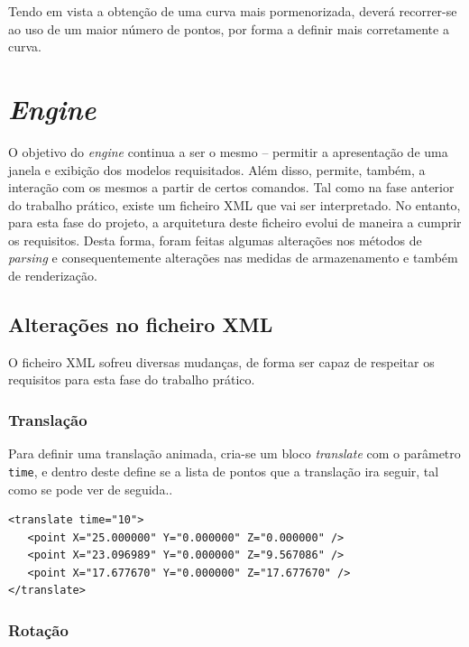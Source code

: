 \documentclass[a4paper, 11pt]{article}
\begin{document}
Tendo em vista a obtenção de uma curva mais pormenorizada, deverá recorrer-se ao uso de um maior 
número de pontos, por forma a definir mais corretamente a curva.

\pagebreak

\section{\textit{Engine}}

O objetivo do \textit{engine} continua a ser o mesmo -- permitir a apresentação de uma janela e 
exibição dos modelos requisitados. Além disso, permite, também, a interação com os mesmos a 
partir de certos comandos. Tal como na fase anterior do trabalho prático, existe um ficheiro XML 
que vai ser interpretado. No entanto, para esta fase do projeto, a arquitetura deste ficheiro 
evolui de maneira a cumprir os requisitos. Desta forma, foram feitas algumas alterações nos 
métodos de \textit{parsing} e consequentemente alterações nas medidas de armazenamento e também 
de renderização.

\subsection{Alterações no ficheiro XML}

O ficheiro XML sofreu diversas mudanças, de forma ser capaz de respeitar os requisitos para esta 
fase do trabalho prático.

\subsubsection{Translação}
\label{sec:xml_trans}

Para definir uma translação animada, cria-se um bloco \textit{translate} com o parâmetro 
\texttt{time}, e dentro deste define se a lista de pontos que a translação ira seguir, tal como 
se pode ver de seguida..

\begin{verbatim}
<translate time="10">
   <point X="25.000000" Y="0.000000" Z="0.000000" />
   <point X="23.096989" Y="0.000000" Z="9.567086" />
   <point X="17.677670" Y="0.000000" Z="17.677670" />
</translate>
\end{verbatim}

\subsubsection{Rotação}
\label{sec:xml_rot}
\end{document}
